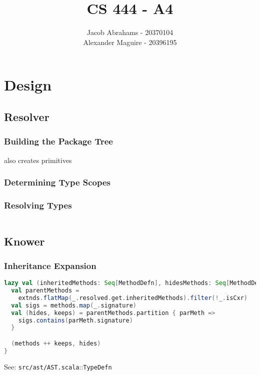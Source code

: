 \documentclass{article}
\title{CS 444 - A4}
\author{Jacob Abrahams - 20370104\\ Alexander Maguire - 20396195}
\begin{document}
\newcommand\type[1]{\texttt{#1}}
\newcommand\func[1]{\texttt{#1}}
\newcommand\code[1]{\texttt{#1}}
\renewcommand\value[1]{\texttt{#1}}
\newcommand\source[2]{See: \texttt{src/#1.scala}::\type{#2} \\}
\newcommand\testsrc[1]{See: \texttt{test/#1.scala} \\}

\maketitle

\section{Design}

\subsection{Resolver}
\subsubsection{Building the Package Tree}
also creates primitives

\subsubsection{Determining Type Scopes}
\subsubsection{Resolving Types}

\begin{lstlisting}[language=Scala]
\end{lstlisting}



\subsection{Knower}
\subsubsection{Inheritance Expansion}

\begin{lstlisting}[language=Scala]
lazy val (inheritedMethods: Seq[MethodDefn], hidesMethods: Seq[MethodDefn]) = {
  val parentMethods =
    extnds.flatMap(_.resolved.get.inheritedMethods).filter(!_.isCxr)
  val sigs = methods.map(_.signature)
  val (hides, keeps) = parentMethods.partition { parMeth =>
    sigs.contains(parMeth.signature)
  }

  (methods ++ keeps, hides)
}
\end{lstlisting}
\source{ast/AST}{TypeDefn}
\end{document}

